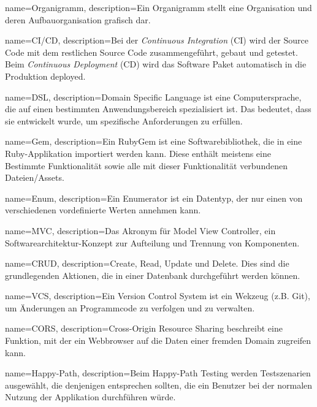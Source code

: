 {
  name={Organigramm},
  description={Ein Organigramm stellt eine Organisation und deren Aufbauorganisation grafisch dar.}
}

{
  name={CI/CD},
  description={Bei der \emph{Continuous Integration} (CI) wird der Source Code mit dem restlichen Source Code zusammengeführt, gebaut und getestet.
      Beim \emph{Continuous Deployment} (CD) wird das Software Paket automatisch in die Produktion deployed.}
}

{
  name={DSL},
  description={Domain Specific Language ist eine Computersprache, die auf einen bestimmten Anwendungsbereich spezialisiert ist. Das bedeutet, dass sie entwickelt wurde, um spezifische Anforderungen zu erfüllen.}
}

{
  name={Gem},
  description={Ein RubyGem ist eine Softwarebibliothek, die in eine Ruby-Applikation importiert werden kann. Diese enthält meistens eine Bestimmte Funktionalität sowie alle mit dieser Funktionalität verbundenen Dateien/Assets.}
}

{
  name={Enum},
  description={Ein Enumerator ist ein Datentyp, der nur einen von verschiedenen vordefinierte Werten annehmen kann.}
}

{
  name={MVC},
  description={Das Akronym für Model View Controller, ein Softwarearchitektur-Konzept zur Aufteilung und Trennung von Komponenten.}
}

{
  name={CRUD},
  description={Create, Read, Update und Delete. Dies sind die grundlegenden Aktionen, die in einer Datenbank durchgeführt werden können.}
}

{
  name={VCS},
  description={Ein Version Control System ist ein Wekzeug (z.B. Git), um Änderungen an Programmcode zu verfolgen und zu verwalten.}
}


{
  name={CORS},
  description={Cross-Origin Resource Sharing beschreibt eine Funktion, mit der ein Webbrowser auf die Daten einer fremden Domain zugreifen kann.}
}

{
  name={Happy-Path},
  description={Beim Happy-Path Testing werden Testszenarien ausgewählt, die denjenigen entsprechen sollten, die ein Benutzer bei der normalen Nutzung der Applikation durchführen würde.}
}

